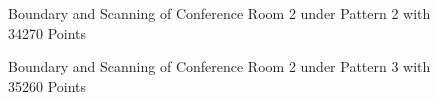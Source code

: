 \documentclass[11pt, a4paper,oneside,chapterprefix=false]{scrbook}
\begin{document}
\begin{figure}[H]
    \centering
      \label{fig:conf2 b 1} \hfill
     \label{fig:conf2 s 1}
    \caption{Boundary and Scanning of Conference Room 2 under Pattern 2 with 34270 Points}
    \label{fig:conf2 1}
\end{figure}

\begin{figure}[H]
    \centering
      \label{fig:conf2 b 2} \hfill
     \label{fig:conf2 s 2}
    \caption{Boundary and Scanning of Conference Room 2 under Pattern 3 with 35260 Points}
    \label{fig:conf2 2}
\end{figure}
\end{document}
